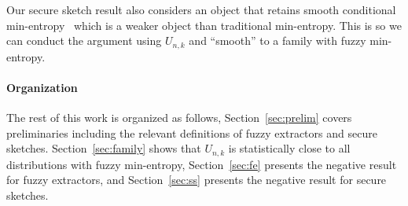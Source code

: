 Our secure sketch result also considers an object that retains smooth conditional min-entropy~\cite{renner2005simple} which is a weaker object than traditional min-entropy.  This is so we can conduct the argument using $U_{n,k}$ and ``smooth'' to a family with fuzzy min-entropy. 



\paragraph{Organization} The rest of this work is organized as follows, Section~\ref{sec:prelim} covers preliminaries including the relevant definitions of fuzzy extractors and secure sketches.  Section~\ref{sec:family} shows that $U_{n,k}$ is statistically close to all distributions with fuzzy min-entropy, Section~\ref{sec:fe} presents the negative result for fuzzy extractors, and Section~\ref{sec:ss} presents the negative result for secure sketches.